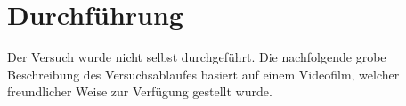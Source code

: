 \section{Durchführung}
\label{sec:durchfuerung}
Der Versuch wurde nicht selbst durchgeführt. Die nachfolgende grobe Beschreibung des Versuchsablaufes basiert auf einem Videofilm, welcher freundlicher Weise zur Verfügung gestellt wurde. 